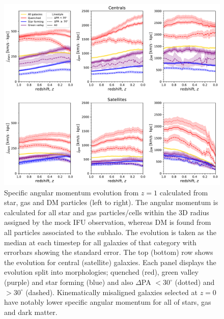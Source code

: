 \begin{figure}
	\includegraphics[width=\linewidth]{misalignment_TNG/sJ_evo_cen_sat.pdf}
    \caption{Specific angular momentum evolution from $z = 1$ calculated from star, gas and DM particles (left to right). The angular momentum is calculated for all star and gas particles/cells within the 3D radius assigned by the mock IFU observation, whereas DM is found from all particles associated to the subhalo. The evolution is taken as the median at each timestep for all galaxies of that category with errorbars showing the standard error. The top (bottom) row shows the evolution for central (satellite) galaxies. Each panel displays the evolution split into morphologies; quenched (red), green valley (purple) and star forming (blue) and also $\Delta$PA $< 30^{\circ}$ (dotted) and $> 30^{\circ}$ (dashed). Kinematically misaligned galaxies selected at $z=0$ have notably lower specific angular momentum for all of stars, gas and dark matter.}
    \label{fig:sJ_evo}
\end{figure}

